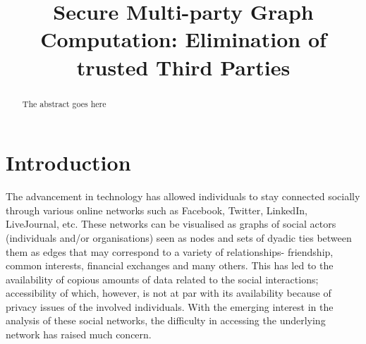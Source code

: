 \documentclass{llncs}
\begin{document}
\title{Secure Multi-party Graph Computation: Elimination of trusted Third Parties }
%


\maketitle
\begin{abstract}
The abstract goes here
\end{abstract}
\section{Introduction}
\linenumbers
The advancement in technology has allowed individuals to stay connected socially through various online 
networks such as Facebook, Twitter, LinkedIn, LiveJournal, etc. These networks can be visualised as graphs of social 
actors (individuals and/or organisations) seen as nodes and sets of dyadic ties between them as edges that may 
correspond to a variety of relationships- friendship, common interests, financial exchanges and many others. 
This has led to the availability of copious amounts of data related to the social interactions; accessibility of which,
however, is not at par with its availability because of privacy issues of the involved individuals. With the emerging 
interest in the analysis of these social networks, the difficulty in accessing the underlying network has raised 
much concern.\\
\end{document}
